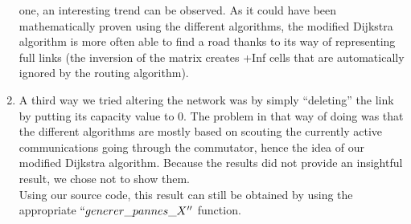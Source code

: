 \documentclass[lettersize,journal]{IEEEtran} %
\begin{document}
\begin{enumerate}
        one, an interesting trend can be observed. As it could have been mathematically proven using the different algorithms, the modified
        Dijkstra algorithm is more often able to find a road thanks to its way of representing full links (the inversion of the matrix creates
        +Inf cells that are automatically ignored by the routing algorithm).
        \item A third way we tried altering the network was by simply ``deleting'' the link by putting its capacity value to 0. The problem in
        that way of doing was that the different algorithms are mostly based on scouting the currently active communications going through
        the commutator, hence the idea of our modified Dijkstra algorithm. Because the results did not provide an insightful result, we chose
        not to show them.\\
        Using our source code, this result can still be obtained by using the appropriate $``generer\_pannes\_X''$ function.
\end{enumerate}
\end{document}
